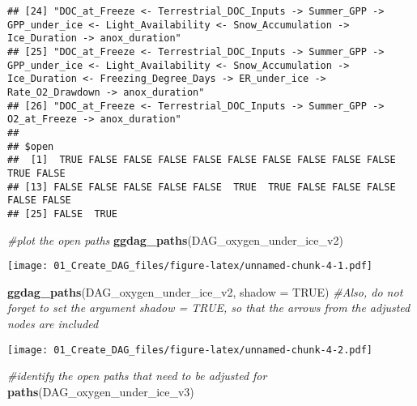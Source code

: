 \documentclass[]{article}
\newenvironment{Shaded}{\begin{snugshade}}{\end{snugshade}}
\newcommand{\CommentTok}[1]{\textcolor[rgb]{0.56,0.35,0.01}{\textit{#1}}}
\newcommand{\DataTypeTok}[1]{\textcolor[rgb]{0.13,0.29,0.53}{#1}}
\newcommand{\KeywordTok}[1]{\textcolor[rgb]{0.13,0.29,0.53}{\textbf{#1}}}
\newcommand{\NormalTok}[1]{#1}
\newcommand{\OtherTok}[1]{\textcolor[rgb]{0.56,0.35,0.01}{#1}}
\begin{document}
\begin{verbatim}
## [24] "DOC_at_Freeze <- Terrestrial_DOC_Inputs -> Summer_GPP -> GPP_under_ice <- Light_Availability <- Snow_Accumulation -> Ice_Duration -> anox_duration"                                                                             
## [25] "DOC_at_Freeze <- Terrestrial_DOC_Inputs -> Summer_GPP -> GPP_under_ice <- Light_Availability <- Snow_Accumulation -> Ice_Duration <- Freezing_Degree_Days -> ER_under_ice -> Rate_O2_Drawdown -> anox_duration"                 
## [26] "DOC_at_Freeze <- Terrestrial_DOC_Inputs -> Summer_GPP -> O2_at_Freeze -> anox_duration"                                                                                                                                         
## 
## $open
##  [1]  TRUE FALSE FALSE FALSE FALSE FALSE FALSE FALSE FALSE FALSE  TRUE FALSE
## [13] FALSE FALSE FALSE FALSE FALSE  TRUE  TRUE FALSE FALSE FALSE FALSE FALSE
## [25] FALSE  TRUE
\end{verbatim}

\begin{Shaded}
\begin{Highlighting}[]
\CommentTok{#plot the open  paths }
\KeywordTok{ggdag_paths}\NormalTok{(DAG_oxygen_under_ice_v2)}
\end{Highlighting}
\end{Shaded}

\texttt{[image: 01\_Create\_DAG\_files/figure-latex/unnamed-chunk-4-1.pdf]}

\begin{Shaded}
\begin{Highlighting}[]
\KeywordTok{ggdag_paths}\NormalTok{(DAG_oxygen_under_ice_v2, }\DataTypeTok{shadow =} \OtherTok{TRUE}\NormalTok{) }\CommentTok{#Also, do not forget to set the argument shadow = TRUE, so that the arrows from the adjusted nodes are included}
\end{Highlighting}
\end{Shaded}

\texttt{[image: 01\_Create\_DAG\_files/figure-latex/unnamed-chunk-4-2.pdf]}

\begin{Shaded}
\begin{Highlighting}[]
\CommentTok{#identify the open paths that need to be adjusted for }
\KeywordTok{paths}\NormalTok{(DAG_oxygen_under_ice_v3)}
\end{Highlighting}
\end{Shaded}
\end{document}
